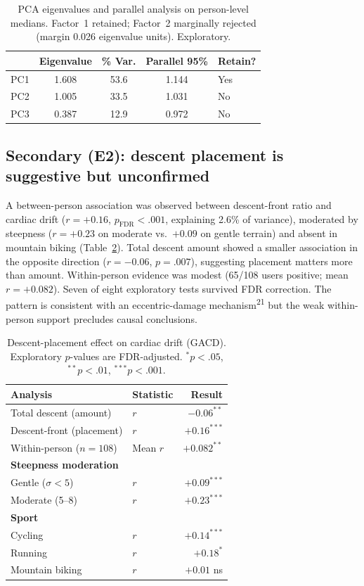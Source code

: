 \documentclass[12pt]{article}
\begin{document}
\begin{table}[t]
\centering
\caption{PCA eigenvalues and parallel analysis on person-level medians.
Factor~1 retained; Factor~2 marginally rejected (margin 0.026 eigenvalue
units). Exploratory.}
\label{tab:pca}
\begin{tabular}{@{}lcccl@{}}
\toprule
 & Eigenvalue & \% Var. & Parallel 95\% & Retain? \\
\midrule
PC1 & 1.608 & 53.6 & 1.144 & Yes \\
PC2 & 1.005 & 33.5 & 1.031 & No \\
PC3 & 0.387 & 12.9 & 0.972 & No \\
\bottomrule
\end{tabular}
\end{table}

\subsection{Secondary (E2): descent placement is suggestive but
unconfirmed}
A between-person association was observed between descent-front ratio and
cardiac drift ($r = +0.16$, $p_{\mathrm{FDR}}<.001$, explaining 2.6\% of
variance), moderated by steepness ($r = +0.23$ on moderate vs.\ $+0.09$ on
gentle terrain) and absent in mountain biking (Table~\ref{tab:descent}).
Total descent amount showed a smaller association in the opposite
direction ($r = -0.06$, $p = .007$), suggesting placement matters more
than amount. Within-person evidence was modest (65/108 users positive;
mean $r = +0.082$). Seven of eight exploratory tests survived FDR
correction. The pattern is consistent with an eccentric-damage
mechanism\textsuperscript{21} but the weak within-person support precludes
causal conclusions.

\begin{table}[t]
\centering
\caption{Descent-placement effect on cardiac drift (GACD). Exploratory
$p$-values are FDR-adjusted. $^{*}p<.05$, $^{**}p<.01$, $^{***}p<.001$.}
\label{tab:descent}
\begin{tabular}{@{}llr@{}}
\toprule
Analysis & Statistic & Result \\
\midrule
Total descent (amount) & $r$ & $-0.06^{**}$ \\
Descent-front (placement) & $r$ & $+0.16^{***}$ \\
Within-person ($n=108$) & Mean $r$ & $+0.082^{**}$ \\
\textbf{Steepness moderation} & & \\
\quad Gentle ($\sigma<5$) & $r$ & $+0.09^{***}$ \\
\quad Moderate (5--8) & $r$ & $+0.23^{***}$ \\
\textbf{Sport} & & \\
\quad Cycling & $r$ & $+0.14^{***}$ \\
\quad Running & $r$ & $+0.18^{*}$ \\
\quad Mountain biking & $r$ & $+0.01$ ns \\
\bottomrule
\end{tabular}
\end{table}
\end{document}
